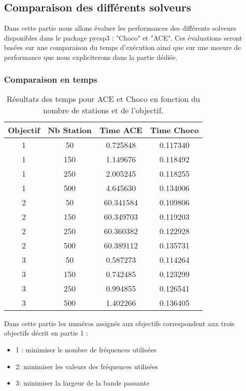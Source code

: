 \documentclass[12pt]{article}
\begin{document}
\subsection{Comparaison des différents solveurs}
Dans cette partie nous allons évaluer les performances des différents solveurs disponibles dans le package
pycsp3 : "Choco" et "ACE". Ces évaluations seront basées sur une comparaison du temps d'exécution ainsi
que sur une mesure de performance que nous expliciterons dans la partie dédiée.
\subsubsection{Comparaison en temps}

\begin{table}[h!]
    \centering
    \begin{tabular}{|c|c|c|c|}
        \hline
        \textbf{Objectif} & \textbf{Nb Station} & \textbf{Time ACE} & \textbf{Time Choco} \\
        \hline
        1 & 50  & 0.725848  & 0.117340  \\
        1 & 150 & 1.149676  & 0.118492  \\
        1 & 250 & 2.005245  & 0.118255  \\
        1 & 500 & 4.645630  & 0.134006  \\
        2 & 50  & 60.341584 & 0.109806  \\
        2 & 150 & 60.349703 & 0.119203  \\
        2 & 250 & 60.360382 & 0.122928  \\
        2 & 500 & 60.389112 & 0.135731  \\
        3 & 50  & 0.587273  & 0.114264  \\
        3 & 150 & 0.742485  & 0.123299  \\
        3 & 250 & 0.994855  & 0.126541  \\
        3 & 500 & 1.402266  & 0.136405  \\
        \hline
    \end{tabular}
    \caption{Résultats des temps pour ACE et Choco en fonction du nombre de stations et de l'objectif.}
    \label{tab:time_results}
\end{table}
Dans cette partie les numéros assignés aux objectifs correspondent aux trois objectifs décrit en partie 1 : 
\begin{itemize}
    \item 1 : minimiser le nombre de fréquences utilisées
    \item 2: minimiser les valeurs des fréquences utilisées
    \item 3: minimiser la largeur de la bande passante
\end{itemize}
\end{document}
